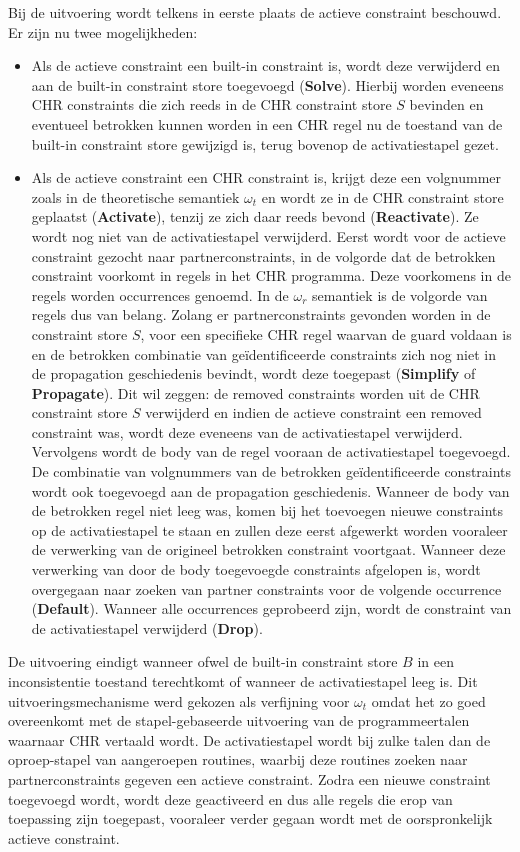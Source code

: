Bij de uitvoering wordt telkens in eerste plaats de actieve constraint beschouwd. Er zijn nu twee mogelijkheden: \begin{itemize}
\item Als de actieve constraint een built-in constraint is, wordt deze verwijderd en aan de built-in constraint store toegevoegd ({\bf Solve}). Hierbij worden eveneens CHR constraints die zich reeds in de CHR constraint store $S$ bevinden en eventueel betrokken kunnen worden in een CHR regel nu de toestand van de built-in constraint store gewijzigd is, terug bovenop de activatiestapel gezet.
\item Als de actieve constraint een CHR constraint is, krijgt deze een volgnummer zoals in de theoretische semantiek $\omega_t$ en wordt ze in de CHR constraint store geplaatst ({\bf Activate}), tenzij ze zich daar reeds bevond ({\bf Reactivate}). Ze wordt nog niet van de activatiestapel verwijderd. Eerst wordt voor de actieve constraint gezocht naar partnerconstraints, in de volgorde dat de betrokken constraint voorkomt in regels in het CHR programma. Deze voorkomens in de regels worden occurrences genoemd. In de $\omega_r$ semantiek is de volgorde van regels dus van belang. Zolang er partnerconstraints gevonden worden in de constraint store $S$, voor een specifieke CHR regel waarvan de guard voldaan is en de betrokken combinatie van ge\"identificeerde constraints zich nog niet in de propagation geschiedenis bevindt, wordt deze toegepast ({\bf Simplify} of {\bf Propagate}). Dit wil zeggen: de removed constraints worden uit de CHR constraint store $S$ verwijderd en indien de actieve constraint een removed constraint was, wordt deze eveneens van de activatiestapel verwijderd. Vervolgens wordt de body van de regel vooraan de activatiestapel toegevoegd. De combinatie van volgnummers van de betrokken ge\"identificeerde constraints wordt ook toegevoegd aan de propagation geschiedenis. Wanneer de body van de betrokken regel niet leeg was, komen bij het toevoegen nieuwe constraints op de activatiestapel te staan en zullen deze eerst afgewerkt worden vooraleer de verwerking van de origineel betrokken constraint voortgaat. Wanneer deze verwerking van door de body toegevoegde constraints afgelopen is, wordt overgegaan naar zoeken van partner constraints voor de volgende occurrence ({\bf Default}). Wanneer alle occurrences geprobeerd zijn, wordt de constraint van de activatiestapel verwijderd ({\bf Drop}).
\end{itemize}
De uitvoering eindigt wanneer ofwel de built-in constraint store $B$ in een inconsistentie toestand terechtkomt of wanneer de activatiestapel leeg is. Dit uitvoeringsmechanisme werd gekozen als verfijning voor $\omega_t$ omdat het zo goed overeenkomt met de stapel-gebaseerde uitvoering van de programmeertalen waarnaar CHR vertaald wordt. De activatiestapel wordt bij zulke talen dan de oproep-stapel van aangeroepen routines, waarbij deze routines zoeken naar partnerconstraints gegeven een actieve constraint. Zodra een nieuwe constraint toegevoegd wordt, wordt deze geactiveerd en dus alle regels die erop van toepassing zijn toegepast, vooraleer verder gegaan wordt met de oorspronkelijk actieve constraint.

